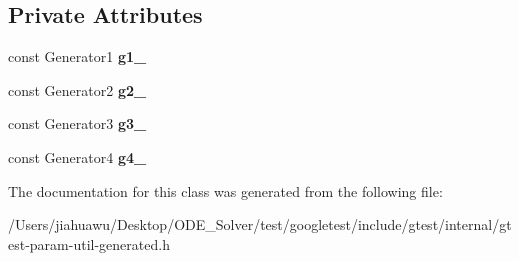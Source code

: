 \subsection*{Private Attributes}
\begin{DoxyCompactItemize}
\item 
\mbox{\label{classtesting_1_1internal_1_1_cartesian_product_holder4_a97b0b3e9d00032e74d2268ea3522b91e}} 
const Generator1 {\bfseries g1\+\_\+}
\item 
\mbox{\label{classtesting_1_1internal_1_1_cartesian_product_holder4_a9ffdd249b134b5e02bda2b0da5e58079}} 
const Generator2 {\bfseries g2\+\_\+}
\item 
\mbox{\label{classtesting_1_1internal_1_1_cartesian_product_holder4_aeb61459965ce3c332f810b71dbd63f51}} 
const Generator3 {\bfseries g3\+\_\+}
\item 
\mbox{\label{classtesting_1_1internal_1_1_cartesian_product_holder4_af2f02bd4d973ffad64c4fb198882b9ef}} 
const Generator4 {\bfseries g4\+\_\+}
\end{DoxyCompactItemize}


The documentation for this class was generated from the following file\+:\begin{DoxyCompactItemize}
\item 
/\+Users/jiahuawu/\+Desktop/\+O\+D\+E\+\_\+\+Solver/test/googletest/include/gtest/internal/gtest-\/param-\/util-\/generated.\+h\end{DoxyCompactItemize}
